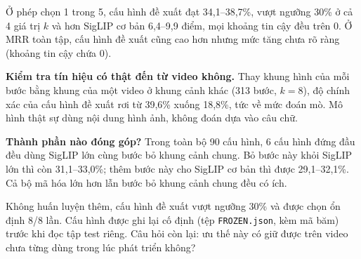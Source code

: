 \documentclass[a4paper,oneside]{report}
\begin{document}
\begin{table}[ht]
\centering
\caption{Giai đoạn 3: cấu hình đề xuất so với SigLIP cơ bản (giai đoạn 2), 2.503 bước, kiểm tra chéo. Hiệu ghép cặp trên cùng bước, khoảng tin cậy 95\%.}
\label{tab:ladder}
\small
{}
\end{table}

Ở phép chọn 1 trong 5, cấu hình đề xuất đạt 34,1--38,7\%, vượt ngưỡng 30\% ở cả 4 giá trị $k$ và hơn SigLIP cơ bản 6,4--9,9 điểm, mọi khoảng tin cậy đều trên 0. Ở MRR toàn tập, cấu hình đề xuất cũng cao hơn nhưng mức tăng chưa rõ ràng (khoảng tin cậy chứa 0).

\textbf{Kiểm tra tín hiệu có thật đến từ video không.} Thay khung hình của mỗi bước bằng khung của một video ở khung cảnh khác (313 bước, $k=8$), độ chính xác của cấu hình đề xuất rơi từ 39,6\% xuống 18,8\%, tức về mức đoán mò. Mô hình thật sự dùng nội dung hình ảnh, không đoán dựa vào câu chữ.

\textbf{Thành phần nào đóng góp?} Trong toàn bộ 90 cấu hình, 6 cấu hình đứng đầu đều dùng SigLIP lớn cùng bước bỏ khung cảnh chung. Bỏ bước này khỏi SigLIP lớn thì còn 31,1--33,0\%; thêm bước này cho SigLIP cơ bản thì được 29,1--32,1\%. Cả bộ mã hóa lớn hơn lẫn bước bỏ khung cảnh chung đều có ích.

\begin{ketqua}
Không huấn luyện thêm, cấu hình đề xuất vượt ngưỡng 30\% và được chọn ổn định 8/8 lần. Cấu hình được ghi lại cố định (tệp \texttt{FROZEN.json}, kèm mã băm) trước khi đọc tập test riêng. Câu hỏi còn lại: ưu thế này có giữ được trên video chưa từng dùng trong lúc phát triển không?
\end{ketqua}
\end{document}
